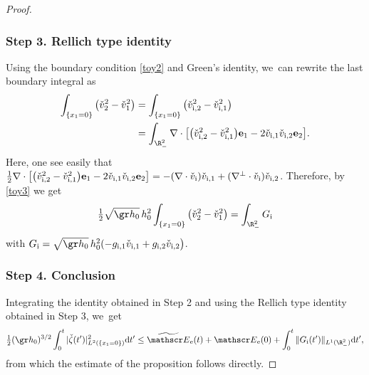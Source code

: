 \begin{proof}
\subsubsection*{Step 3. Rellich type identity}
Using the boundary condition \eqref{toy2} and Green's identity, we~can rewrite the last boundary integral as
\begin{align*}
\int_{\{x_1=0\}}\big(\check{v}_2^2- \check{v}_1^2\big)
&= \int_{\{x_1=0\}}\big(\check{v}_\mathrm{i,2}^2- \check{v}_\mathrm{i,1}^2\big)\\
&= \int_{\R^2_-}\nabla\cdot \big[\big(\check{v}_\mathrm{i,2}^2- \check{v}_\mathrm{i,1}^2\big) {\bf e}_1- 2 \check{v}_\mathrm{i,1}\check{v}_\mathrm{i,2}{\bf e}_2\big].
\end{align*}
Here, one see easily that
$\frac{1}{2}\nabla\cdot \big[\big(\check{v}_\mathrm{i,2}^2-\check{v}_\mathrm{i,1}^2\big) {\bf e}_1- 2 \check{v}_\mathrm{i,1}\check{v}_\mathrm{i,2}{\bf e}_2\big]
=-(\nabla\cdot \check{v}_\mathrm{i})\check{v}_\mathrm{i,1}+(\nabla^\perp \cdot \check{v}_\mathrm{i})\check{v}_\mathrm{i,2}$.
Therefore, by \eqref{toy3} we get
\[
\tfrac{1}{2}\sqrt{\gr h_0}\,h_0^2 \int_{\{x_1=0\}} \big(\check{v}_2^2-\check{v}_1^2\big)=\int_{\R^2_-}G_\mathrm{i}
\]
with $G_\mathrm{i}=\sqrt{\gr h_0}\,h_0^2 (-g_\mathrm{i,1}\check{v}_\mathrm{i,1}+g_\mathrm{i,2}\check{v}_\mathrm{i,2}\big)$.

\subsubsection*{Step 4. Conclusion}
Integrating the identity obtained in Step 2 and using the Rellich type identity obtained in Step 3, we~get
\[
\tfrac{1}{2}(\gr h_0)^{3/2}\int_0^t \vert \check{\zeta}(t')\vert^2_{L^2(\{x_1=0\})}{\rm d}t'
\leq \widetilde{\mathscr E}_\mathrm{e}(t) + {\mathscr E}_\mathrm{e}(0)+\int_0^t \Vert G_\mathrm{i}(t')\Vert_{L^1(\R^2_-)}{\rm d}t',
\]
from which the estimate of the proposition follows directly.
\end{proof}

